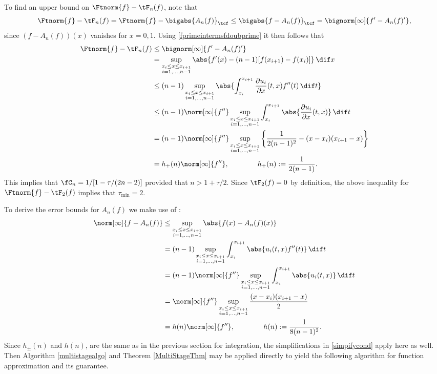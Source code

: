 To find an upper bound on $\Ftnorm{f}-\tF_{n}(f)$, note that 
\begin{equation*}
\Ftnorm{f} - \tF_{n}(f) = \Ftnorm{f} - \bigabs{A_n(f)}_{\tcf} \le \bigabs{f-A_n(f)}_{\tcf} = \bignorm[\infty]{f' -A_n(f)'},
\end{equation*}
since $(f-A_n(f))(x)$ vanishes for $x=0,1$. Using \eqref{fprimeintermsfdoubprime} it then follows that 
\begin{align*}
\Ftnorm{f} - \tF_{n}(f) & \le \bignorm[\infty]{f' -A_n(f)'} \\
& = \sup_{\substack{x_i \le x \le x_{i+1}\\ i=1, \ldots, n-1 }} \abs{f'(x) -(n-1)[f(x_{i+1})-f(x_i)]} \, \dif x \\
&\le(n-1) \sup_{\substack{x_i \le x \le x_{i+1}\\ i=1, \ldots, n-1 }} \abs{ \int_{x_i}^{x_{i+1}} \frac{\partial u_i}{\partial x}(t,x) f''(t) \, \dif t} \\
& \le (n-1) \norm[\infty]{f''} \sup_{\substack{x_i \le x \le x_{i+1}\\ i=1, \ldots, n-1 }} \int_{x_i}^{x_{i+1}} \abs{\frac{\partial u_i}{\partial x}(t,x)} \, \dif t \\
&=(n-1)\norm[\infty]{f''} \sup_{\substack{x_i \le x \le x_{i+1}\\ i=1, \ldots, n-1 }} \left \{\frac{1}{2(n-1)^2} - (x-x_i)(x_{i+1}-x) \right\} \\
&= h_+(n) \norm[\infty]{f''}, \qquad \qquad  h_+(n):= \frac{1}{2(n-1)}.
\end{align*}
This implies that $\fC_n =1/[1 - \tau /(2n-2)]$ provided that $n>1+\tau/2$.
Since $\tF_2(f)=0$ by definition, the above inequality for $\Ftnorm{f} - \tF_{2}(f)$ implies that $\tau_{\min}=2$.

To derive the error bounds for $A_n(f)$ we make use of \label{fintermsfdoubprime}:
\begin{align*}
\norm[\infty]{f-A_n(f)}
& \le \sup_{\substack{x_i \le x \le x_{i+1}\\ i=1, \ldots, n-1 }} \abs{f(x)-A_n (f)(x)}\\
&= (n-1)\sup_{\substack{x_i \le x \le x_{i+1}\\ i=1, \ldots, n-1 }}  \int_{x_i}^{x_{i+1}} \abs{u_i(t,x) f''(t)} \, \dif t\\
&= (n-1)\norm[\infty]{f''} \sup_{\substack{x_i \le x \le x_{i+1}\\ i=1, \ldots, n-1 }}  \int_{x_i}^{x_{i+1}} \abs{u_i(t,x)} \, \dif t\\
&=\norm[\infty]{f''} \sup_{\substack{x_i \le x \le x_{i+1}\\ i=1, \ldots, n-1 }}  \frac{(x-x_i)(x_{i+1}-x)}2 \\
&= h(n) \norm[\infty]{f''}, \qquad \qquad  h(n):= \frac{1}{8(n-1)^2}.
\end{align*}
Since $h_{\pm}(n)$ and $h(n)$, are the same as in the previous section for integration, the simplifications in \eqref{simpifycond} apply here as well.  Then Algorithm \ref{multistagealgo} and Theorem \ref{MultiStageThm} may be applied directly to  yield the following algorithm for function approximation and its guarantee.

